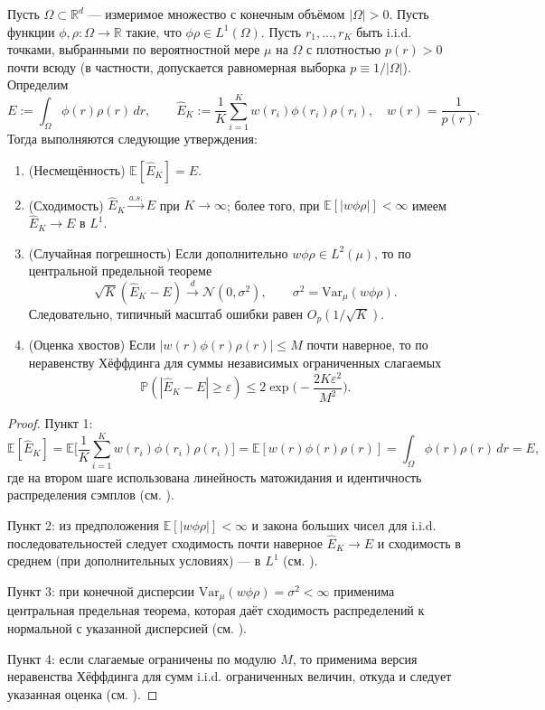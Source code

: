 \documentclass[a4paper,14pt,oneside,openany]{extarticle}
\begin{document}
\begin{lemma}
Пусть $\Omega\subset\mathbb{R}^d$ — измеримое множество с конечным объёмом $|\Omega|>0$. Пусть функции $\phi,\rho:\Omega\to\mathbb{R}$ такие, что $\phi\rho\in L^1(\Omega)$. Пусть $r_1,\dots,r_K$ быть i.i.d. точками, выбранными по вероятностной мере $\mu$ на $\Omega$ с плотностью $p(r)>0$ почти всюду (в частности, допускается равномерная выборка $p\equiv1/|\Omega|$). Определим
\[ E:=\int_{\Omega}\phi(r)\rho(r)\,dr,\qquad \hat E_K:=\frac{1}{K}\sum_{i=1}^K w(r_i)\phi(r_i)\rho(r_i),\quad w(r)=\frac{1}{p(r)}.\]
Тогда выполняются следующие утверждения:
\begin{enumerate}
\item (Несмещённость) $\mathbb{E}[\hat E_K]=E$.
\item (Сходимость) $\hat E_K\xrightarrow{a.s.}E$ при $K\to\infty$; более того, при $\mathbb{E}[|w\phi\rho|]<\infty$ имеем $\hat E_K\to E$ в $L^1$.
\item (Случайная погрешность) Если дополнительно $w\phi\rho\in L^2(\mu)$, то по центральной предельной теореме
\[ \sqrt{K}(\hat E_K-E)\xrightarrow{d}\mathcal{N}(0,\sigma^2),\qquad \sigma^2=\mathrm{Var}_\mu(w\phi\rho). \]
Следовательно, типичный масштаб ошибки равен $O_p(1/\sqrt{K})$.
\item (Оценка хвостов) Если $|w(r)\phi(r)\rho(r)|\le M$ почти наверное, то по неравенству Хёффдинга для суммы независимых ограниченных слагаемых
\[ \mathbb{P}(|\hat E_K-E|\ge\varepsilon)\le 2\exp\Big(-\frac{2K\varepsilon^2}{M^2}\Big). \]
\end{enumerate}
\end{lemma}

\begin{proof}
Пункт 1: 
\[ \mathbb{E}[\hat E_K]=\mathbb{E}\Big[\frac{1}{K}\sum_{i=1}^K w(r_i)\phi(r_i)\rho(r_i)\Big]=\mathbb{E}[w(r)\phi(r)\rho(r)]=\int_{\Omega} \phi(r)\rho(r)\,dr=E, \]
где на втором шаге использована линейность матожидания и идентичность распределения сэмплов (см. \cite{Billingsley1995}).

Пункт 2: из предположения $\mathbb{E}[|w\phi\rho|]<\infty$ и закона больших чисел для i.i.d. последовательностей следует сходимость почти наверное $\hat E_K\to E$ и сходимость в среднем (при дополнительных условиях) --- в $L^1$ (см. \cite{Billingsley1995}).

Пункт 3: при конечной дисперсии $\mathrm{Var}_\mu(w\phi\rho)=\sigma^2<\infty$ применима центральная предельная теорема, которая даёт сходимость распределений к нормальной с указанной дисперсией (см. \cite{VanDerVaart1998}).

Пункт 4: если слагаемые ограничены по модулю $M$, то применима версия неравенства Хёффдинга для сумм i.i.d. ограниченных величин, откуда и следует указанная оценка (см. \cite{Hoeffding1963}).
\end{proof}
\end{document}
